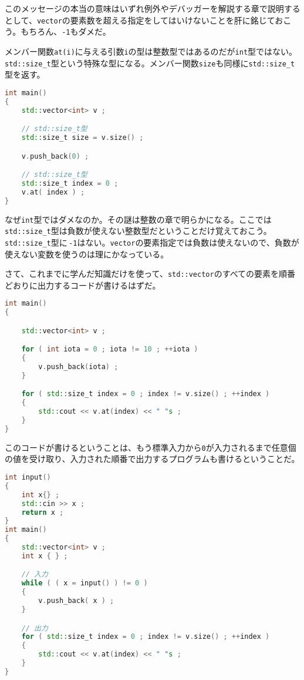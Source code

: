 このメッセージの本当の意味はいずれ例外やデバッガーを解説する章で説明するとして、\texttt{vector}の要素数を超える指定をしてはいけないことを肝に銘じておこう。もちろん、\texttt{-1}もダメだ。

メンバー関数\texttt{at(i)}に与える引数\texttt{i}の型は整数型ではあるのだが\texttt{int}型ではない。\texttt{std::size\_t}型という特殊な型になる。メンバー関数\texttt{size}も同様に\texttt{std::size\_t}型を返す。

\begin{lstlisting}[language={C++}]
int main()
{
    std::vector<int> v ;

    // std::size_t型
    std::size_t size = v.size() ;

    v.push_back(0) ;

    // std::size_t型
    std::size_t index = 0 ;
    v.at( index ) ;
}
\end{lstlisting}

なぜ\texttt{int}型ではダメなのか。その謎は整数の章で明らかになる。ここでは\texttt{std::size\_t}型は負数が使えない整数型だということだけ覚えておこう。\texttt{std::size\_t}型に\,\texttt{-1}はない。\texttt{vector}の要素指定では負数は使えないので、負数が使えない変数を使うのは理にかなっている。

さて、これまでに学んだ知識だけを使って、\texttt{std::vector}のすべての要素を順番どおりに出力するコードが書けるはずだ。

\begin{lstlisting}[language={C++}]
int main()
{

    std::vector<int> v ;

    for ( int iota = 0 ; iota != 10 ; ++iota )
    {
        v.push_back(iota) ;
    }

    for ( std::size_t index = 0 ; index != v.size() ; ++index )
    {
        std::cout << v.at(index) << " "s ;
    }
}
\end{lstlisting}

このコードが書けるということは、もう標準入力から\texttt{0}が入力されるまで任意個の値を受け取り、入力された順番で出力するプログラムも書けるということだ。

\begin{lstlisting}[language={C++}]
int input()
{
    int x{} ;
    std::cin >> x ;
    return x ;
}
int main()
{
    std::vector<int> v ;
    int x { } ;

    // 入力
    while ( ( x = input() ) != 0 )
    {
        v.push_back( x ) ;
    }

    // 出力
    for ( std::size_t index = 0 ; index != v.size() ; ++index )
    {
        std::cout << v.at(index) << " "s ;
    }
}
\end{lstlisting}

